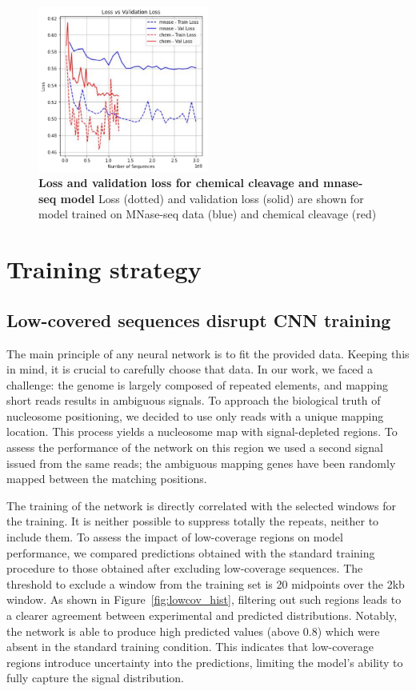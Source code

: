 \documentclass[11pt]{book}
\begin{document}
\begin{figure}[htbp]
    \centering
    \includegraphics[width=0.5\textwidth]{Figures/Results/loss_curves.pdf}
    \caption{\textbf{Loss and validation loss for chemical cleavage and mnase-seq model} Loss (dotted) and validation loss (solid) are shown for model trained on MNase-seq data (blue) and chemical cleavage (red)}
    \label{fig:loss_curves}
\end{figure}

\section{Training strategy}

\subsection{Low-covered sequences disrupt CNN training}
The main principle of any neural network is to fit the provided data. Keeping this in mind, it is crucial to carefully choose that data. In our work, we faced a challenge: the genome is largely composed of repeated elements, and mapping short reads results in ambiguous signals. To approach the biological truth of nucleosome positioning, we decided to use only reads with a unique mapping location. This process yields a nucleosome map with signal-depleted regions. To assess the performance of the network on this region we used a second signal issued from the same reads; the ambiguous mapping genes have been randomly mapped between the matching positions.

The training of the network is directly correlated with the selected windows for the training. It is neither possible to suppress totally the repeats, neither to include them. To assess the impact of low-coverage regions on model performance, we compared predictions obtained with the standard training procedure to those obtained after excluding low-coverage sequences. The threshold to exclude a window from the training set is 20 midpoints over the 2kb window. As shown in Figure~\ref{fig:lowcov_hist}, filtering out such regions leads to a clearer agreement between experimental and predicted distributions. Notably, the network is able to produce high predicted values (above 0.8) which were absent in the standard training condition. This indicates that low-coverage regions introduce uncertainty into the predictions, limiting the model's ability to fully capture the signal distribution.
\end{document}
